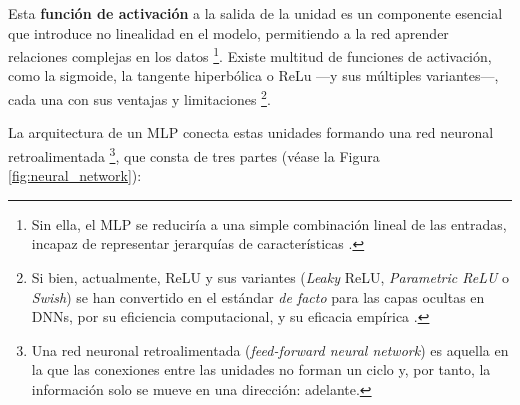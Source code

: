 Esta \textbf{función de activación} a la salida de la unidad es un componente esencial que introduce no 
linealidad en el modelo, permitiendo a la red aprender relaciones complejas en los datos%
\footnote{
    Sin ella, el MLP se reduciría a una simple combinación lineal de las entradas, incapaz de
    representar jerarquías de características \cite{murphy2022}.
}.
Existe multitud de funciones de activación, como la sigmoide, la tangente hiperbólica o ReLu ---y sus 
múltiples variantes---, cada una con sus ventajas y limitaciones%
\footnote{
    Si bien, actualmente, ReLU y sus variantes (\textit{Leaky} ReLU, \textit{Parametric ReLU} o 
    \textit{Swish}) se han convertido en el estándar \textit{de facto} para las capas ocultas en DNNs,
    por su eficiencia computacional, y su eficacia empírica \cite{vargas2021}.
}.

La arquitectura de un MLP conecta estas unidades formando una red neuronal retroalimentada%
\footnote{
    Una red neuronal retroalimentada (\textit{feed-forward neural network}) es aquella en la que las 
    conexiones entre las unidades no forman un ciclo y, por tanto, la información solo se mueve en una 
    dirección: adelante.
},
que consta de tres partes (véase la Figura \ref{fig:neural_network}):


